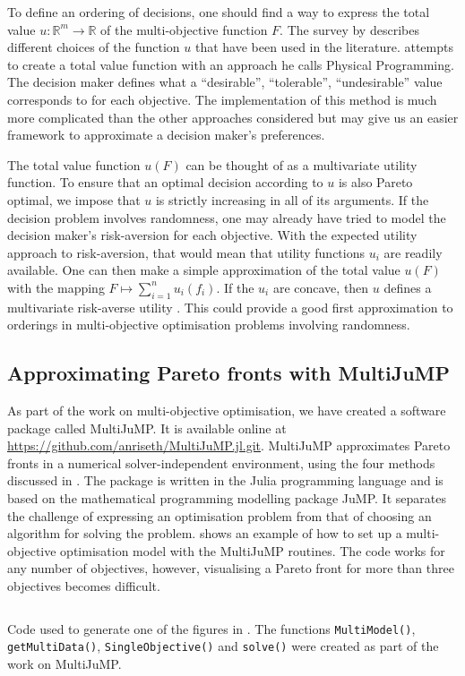 \documentclass[main.tex]{subfiles}
\begin{document}
To define an ordering of decisions, one should find a way to express
the total value $u:\mathbb{R}^m\to\mathbb{R}$ of the multi-objective
function $F$. The survey by \citet{marler2004survey} describes
different choices of the function $u$ that have been used in the literature.
\citet{messac1996physical} attempts to create a total value function
with an approach he calls Physical Programming. The decision
maker defines what a ``desirable'', ``tolerable'',
``undesirable'' value corresponds to for each objective. The implementation of this method
is much more complicated than the other approaches considered but
may give us an easier framework to approximate a decision maker's preferences.

The total value function $u(F)$ can be thought of as a
multivariate utility function. To ensure that an optimal decision
according to $u$ is also Pareto optimal, we impose that $u$ is
strictly increasing in all of its arguments.
If the decision problem involves randomness, one may already have
tried to model the decision maker's risk-aversion for each objective.
With the expected utility approach to risk-aversion, that would mean
that utility functions $u_i$ are readily available. One can then make
a simple approximation of
the total value $u(F)$ with the mapping $F\mapsto \sum_{i=1}^n u_i(f_i)$.
If the $u_i$ are concave, then $u$ defines a multivariate risk-averse
utility \citep[Sec. 2.3.2]{campi2011multivariate}.
This could provide a good first approximation to orderings in
multi-objective optimisation problems involving randomness.


\subsection{Approximating Pareto fronts with
  MultiJuMP}\label{sec:one_multijump}
As part of the work on multi-objective optimisation, we have created a
software package called MultiJuMP.  It is available online at
\url{https://github.com/anriseth/MultiJuMP.jl.git}.  MultiJuMP
approximates Pareto fronts in a numerical solver-independent
environment, using the four methods discussed in
.  The package is written in the Julia
programming language and is based on the
mathematical programming modelling package JuMP. It separates the
challenge of expressing an
optimisation problem from that of choosing an algorithm for solving
the problem.  shows an example of how to set up a
multi-objective optimisation model with the MultiJuMP routines. The
code works for any number of objectives, however, visualising a Pareto
front for more than three objectives becomes difficult.
\begin{listing}[htbp]
  \inputminted{julia}{./include/multijump.jl}
  \caption{Code used to generate one of the figures in
    .
    The functions \texttt{MultiModel()},
    \texttt{getMultiData()},
    \texttt{SingleObjective()} and \texttt{solve()}
    were created as part of the work on MultiJuMP.
  }\label{lst:multijump}
\end{listing}


\biblio{} %
\end{document}
